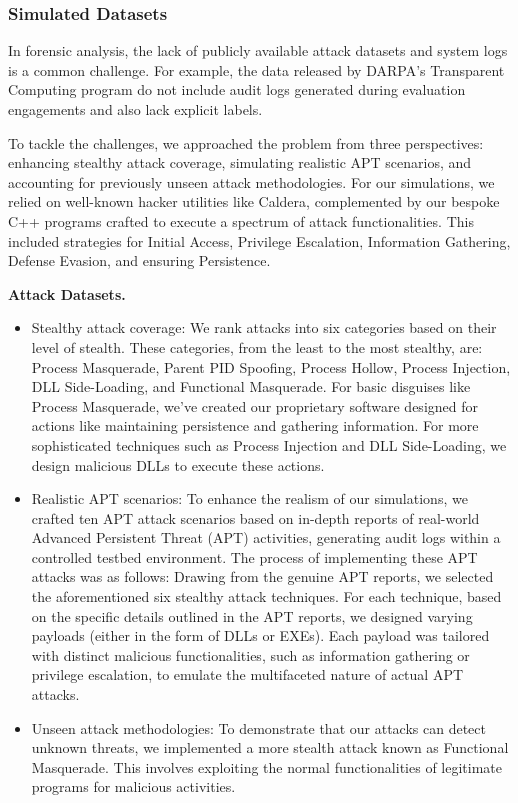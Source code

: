 \subsubsection{Simulated Datasets}



In forensic analysis, the lack of publicly available attack datasets and system logs is a common challenge. For example, the data released by DARPA's Transparent Computing program do not include audit logs generated during evaluation engagements and also lack explicit labels. 

To tackle the challenges, we approached the problem from three perspectives: enhancing stealthy attack coverage, simulating realistic APT scenarios, and accounting for previously unseen attack methodologies. 
For our simulations, we relied on well-known hacker utilities like Caldera, complemented by our bespoke C++ programs crafted to execute a spectrum of attack functionalities. This included strategies for Initial Access, Privilege Escalation, Information Gathering, Defense Evasion, and ensuring Persistence.


\textbf{Attack Datasets.}
\begin{itemize}
    \item  Stealthy attack coverage: We rank attacks into six categories based on their level of stealth. These categories, from the least to the most stealthy, are: Process Masquerade, Parent PID Spoofing, Process Hollow, Process Injection, DLL Side-Loading, and Functional Masquerade. For basic disguises like Process Masquerade, we've created our proprietary software designed for actions like maintaining persistence and gathering information. For more sophisticated techniques such as Process Injection and DLL Side-Loading, we design malicious DLLs to execute these actions.
    \item Realistic APT scenarios: To enhance the realism of our simulations, we crafted ten APT attack scenarios based on in-depth reports of real-world Advanced Persistent Threat (APT) activities, generating audit logs within a controlled testbed environment. The process of implementing these APT attacks was as follows: Drawing from the genuine APT reports, we selected the aforementioned six stealthy attack techniques. For each technique, based on the specific details outlined in the APT reports, we designed varying payloads (either in the form of DLLs or EXEs). Each payload was tailored with distinct malicious functionalities, such as information gathering or privilege escalation, to emulate the multifaceted nature of actual APT attacks.
    \item Unseen attack methodologies: To demonstrate that our attacks can detect unknown threats, we implemented a more stealth attack known as Functional Masquerade. This involves exploiting the normal functionalities of legitimate programs for malicious activities.
\end{itemize}

